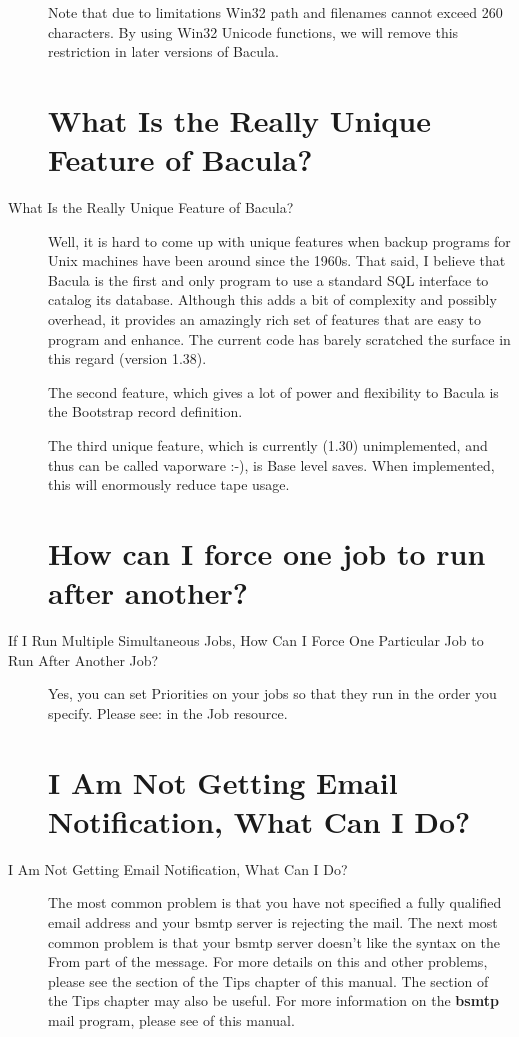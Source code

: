 \begin{description}
   Note that due to limitations Win32 path and filenames cannot exceed
   260 characters. By using Win32 Unicode functions, we will remove this
   restriction in later versions of Bacula.

\label{unique}
\section{What Is the Really Unique Feature of Bacula?}
\item [What Is the Really Unique Feature of Bacula?]
   Well, it is hard to come up with unique features when backup programs
   for Unix machines have been around since the 1960s.  That said, I
   believe that Bacula is the first and only program to use a standard SQL
   interface to catalog its database.  Although this adds a bit of
   complexity and possibly overhead, it provides an amazingly rich set of
   features that are easy to program and enhance.  The current code has
   barely scratched the surface in this regard (version 1.38).

   The second feature, which gives a lot of power and flexibility to Bacula
   is the Bootstrap record definition.

   The third unique feature, which is currently (1.30) unimplemented, and
   thus can be called vaporware :-), is Base level saves.  When
   implemented, this will enormously reduce tape usage.

\label{sequence}
\section{How can I force one job to run after another?}
\item [If I Run Multiple Simultaneous Jobs, How Can I Force One
   Particular  Job to Run After Another Job? ]
Yes, you can set Priorities on your jobs so that they  run in the order you
specify. Please see:
 in the  Job resource.

\label{nomail}
\section{I Am Not Getting Email Notification, What Can I Do? }
\item [I Am Not Getting Email Notification, What Can I Do? ]
   The most common problem is that you have not specified a fully qualified
   email address and your bsmtp server is rejecting the mail.  The next
   most common problem is that your bsmtp server doesn't like the syntax on
   the From part of the message.  For more details on this and other
   problems, please see the  section of the Tips chapter of this manual.  The section
    of the Tips
   chapter may also be useful.  For more information on the {\bf bsmtp}
   mail program, please see  of this manual.


\end{description}
